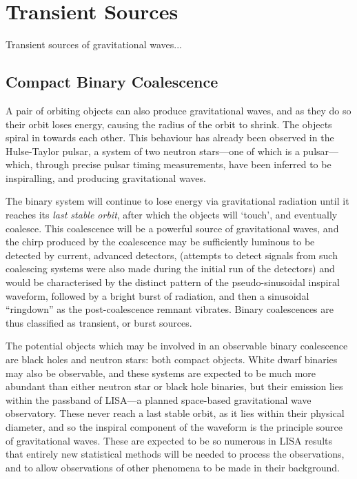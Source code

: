 \documentclass{kentigern}
\begin{document}
\section{Transient Sources}
\label{sec:transient-sources}

Transient sources of gravitational waves...

\subsection{Compact Binary Coalescence}
\label{sec:cbc}
A pair of orbiting objects can also produce gravitational waves, and
as they do so their orbit loses energy, causing the radius of the
orbit to shrink. The objects spiral in towards each other. This
behaviour has already been observed in the Hulse-Taylor
pulsar\cite{1975ApJ...195L..51H}\cite{2005ASPC..328...25W}, a system
of two neutron stars---one of which is a pulsar--- which, through
precise pulsar timing measurements, have been inferred to be
inspiralling, and producing gravitational waves.

The binary system will continue to lose energy via gravitational
radiation until it reaches its \emph{last stable orbit}, after which
the objects will `touch', and eventually coalesce. This coalescence
will be a powerful source of gravitational waves, and the chirp
produced by the coalescence may be sufficiently luminous to be
detected by current, advanced detectors, (attempts to detect signals
from such coalescing systems were also made during the initial run of
the detectors\cite{2012PhRvD..85h2002A}) and would be characterised by
the distinct pattern of the pseudo-sinusoidal inspiral waveform,
followed by a bright burst of radiation, and then a sinusoidal
``ringdown'' as the post-coalescence remnant
vibrates\cite{2009LRR....12....2S}. Binary coalescences are thus
classified as transient, or burst sources.

The potential objects which may be involved in an observable binary
coalescence are black holes and neutron stars: both compact
objects. White dwarf binaries may also be observable, and these
systems are expected to be much more abundant than either neutron star
or black hole binaries, but their emission lies within the passband of
LISA---a planned space-based gravitational wave observatory. These
never reach a last stable orbit, as it lies within their physical
diameter, and so the inspiral component of the waveform is the
principle source of gravitational waves. These are expected to be so
numerous in LISA results\cite{2013GWN.....6....4A} that entirely new statistical methods will be
needed to process the observations, and to allow observations of other
phenomena to be made in their background.
\end{document}
